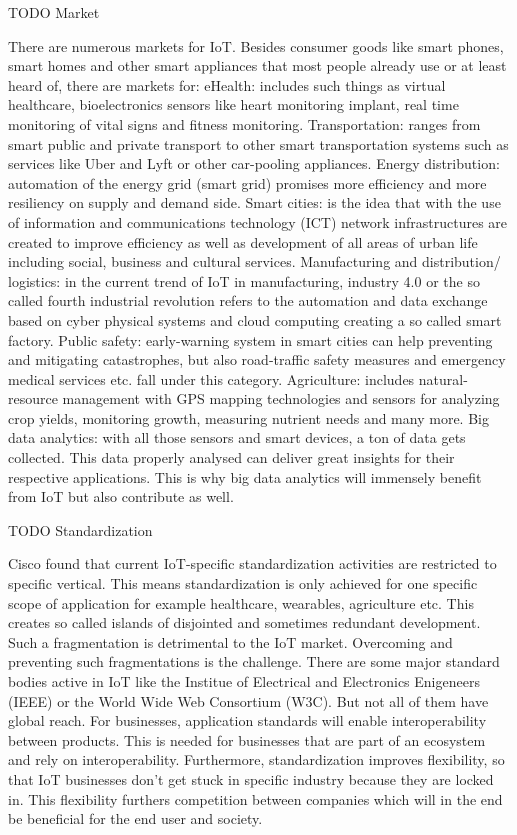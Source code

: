 		TODO Market

		There are numerous markets for IoT. Besides consumer goods like smart phones, smart homes and other smart appliances that most people already use or at least heard of, there are markets for:
		eHealth:  includes such things as virtual healthcare, bioelectronics sensors  like heart monitoring implant, real time monitoring of vital signs and fitness monitoring.
		Transportation:  ranges from smart public and private transport to other smart transportation systems such as services like Uber and Lyft or other car-pooling appliances. 
		Energy distribution: automation of the energy grid (smart grid) promises more efficiency and more resiliency on supply and demand side.
		Smart cities: is the idea that with the use of information and communications technology (ICT) network infrastructures are created to improve efficiency as well as development of all areas of urban life including social, business and cultural services.
		Manufacturing and distribution/ logistics: in the current trend of IoT in manufacturing, industry 4.0 or the so called fourth industrial revolution refers to the automation and data exchange based on cyber physical systems and cloud computing creating a so called smart factory. 
		Public safety: early-warning system in smart cities can help preventing and mitigating catastrophes, but also road-traffic safety measures and emergency medical services etc. fall under this category.
		Agriculture: includes natural-resource management with GPS mapping technologies and sensors for analyzing crop yields, monitoring growth, measuring nutrient needs and many more.
		Big data analytics: with all those sensors and smart devices, a ton of data gets collected. This data properly analysed can deliver great insights for their respective applications. This is why big data analytics will immensely benefit from IoT but also contribute as well.

		TODO Standardization

		Cisco found that current IoT-specific standardization activities are restricted to specific vertical. This means standardization is only achieved for one specific scope of application for example healthcare, wearables, agriculture etc. This creates so called islands of disjointed and sometimes redundant development.
		Such a fragmentation is detrimental to the IoT market. Overcoming and preventing such fragmentations is the challenge. There are some major standard bodies active in IoT like the Institue of Electrical and Electronics Enigeneers (IEEE) or the World Wide Web Consortium (W3C). But not all of them have global reach.
		For businesses, application standards will enable interoperability between products.  This is needed for businesses that are part of an ecosystem and rely on interoperability. Furthermore, standardization improves flexibility, so that IoT businesses don't get stuck in specific industry because they are locked in. This flexibility furthers competition between companies which will in the end be beneficial for the end user and society.

